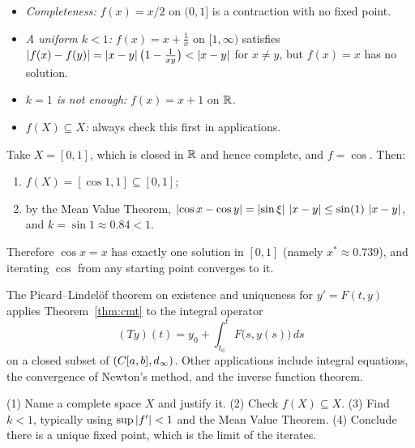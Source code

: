 \begin{warning}
\leavevmode
\begin{itemize}
  \item \emph{Completeness:} $f(x)=x/2$ on $(0,1]$ is a contraction with no fixed point.
  \item \emph{A uniform $k<1$:} $f(x)=x+\frac1x$ on $[1,\infty)$ satisfies $\left\lvert f(x)-f(y)\right\rvert=\left\lvert x-y\right\rvert\bigl(1-\tfrac1{xy}\bigr)<\left\lvert x-y\right\rvert$ for $x\ne y$, but $f(x)=x$ has no solution.
  \item \emph{$k=1$ is not enough:} $f(x)=x+1$ on $\mathbb{R}$.
  \item \emph{$f(X)\subseteq X$:} always check this first in applications.
\end{itemize}
\end{warning}

\begin{example}[Solving $\cos x=x$]
Take $X=[0,1]$, which is closed in $\mathbb{R}$ and hence complete, and $f=\cos$. Then:
\begin{enumerate}[label=(\roman*)]
  \item $f(X)=[\cos1,1]\subseteq[0,1]$;
  \item by the Mean Value Theorem, $\left\lvert \cos x-\cos y\right\rvert=\left\lvert \sin\xi\right\rvert\,\left\lvert x-y\right\rvert\le\sin(1)\,\left\lvert x-y\right\rvert$, and $k=\sin1\approx0.84<1$.
\end{enumerate}
Therefore $\cos x=x$ has exactly one solution in $[0,1]$ (namely $x^*\approx0.739$), and iterating $\cos$ from any starting point converges to it.
\end{example}

\begin{remark}
The Picard--Lindelöf theorem on existence and uniqueness for $y'=F(t,y)$ applies Theorem~\ref{thm:cmt} to the integral operator
\[ (Ty)(t)=y_0+\int_{t_0}^tF\bigl(s,y(s)\bigr)\,ds \]
on a closed subset of $(C[a,b],d_\infty)$. Other applications include integral equations, the convergence of Newton's method, and the inverse function theorem.
\end{remark}

\begin{examtip}
(1) Name a complete space $X$ and justify it. (2) Check $f(X)\subseteq X$. (3) Find $k<1$, typically using $\sup\left\lvert f'\right\rvert<1$ and the Mean Value Theorem. (4) Conclude there is a unique fixed point, which is the limit of the iterates.
\end{examtip}

